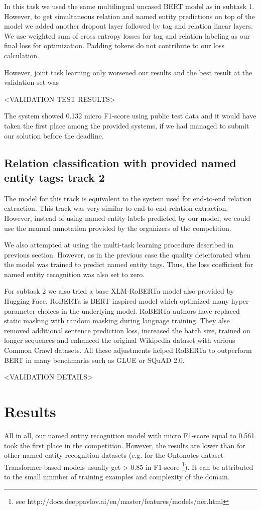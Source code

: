 \documentclass{dialogue}
\begin{document}
	In this task we used the same multilingual uncased BERT model as in subtask 1. However, to get simultaneous relation and named entity predictions on top of the model we added another dropout layer followed by tag and relation linear layers. We use weighted sum of cross entropy losses for tag and relation labeling as our final loss for optimization. Padding tokens do not contribute to our loss calculation.
	
	However, joint task learning only worsened our results and the best result at the validation set was
	
	<VALIDATION TEST RESULTS>
	
	The system showed 0.132 micro F1-score using public test data and it would have taken the first place among the provided systems, if we had managed to submit our solution before the deadline.
	\subsection{Relation classification with provided named entity tags: track 2}
	The model for this track is equivalent to the system used for end-to-end relation extraction. This track was very similar to end-to-end relation extraction. However, instead of using named entity labels predicted by our model, we could use the manual annotation provided by the organizers of the competition.
	
	We also attempted at using the multi-task learning procedure described in previous section. However, as in the previous case the quality deteriorated when the model was trained to predict named entity tags. Thus, the loss coefficient for named entity recognition was also set to zero.
	
	For subtask 2 we also tried a base XLM-RoBERTa \cite{roberta} model also provided by Hugging Face. RoBERTa is BERT inspired model which optimized many hyper-parameter choices in the underlying model. RoBERTa authors have replaced static masking with random masking during language training. They alse removed additional sentence prediction loss, increased the batch size, trained on longer sequences and enhanced the original Wikipedia dataset with various Common Crawl datasets. All these adjustments helped RoBERTa to outperform BERT in many benchmarks such as GLUE or SQuAD 2.0.
	
	<VALIDATION DETAILS>
	
	\section{Results}
	All in all, our named entity recognition model with micro F1-score equal to 0.561 took the first place in the competition. However, the results are lower than for other named entity recognition datasets (e.g. for the Ontonotes dataset Transformer-based models usually get > 0.85 in F1-score \footnote{see http://docs.deeppavlov.ai/en/master/features/models/ner.html}). It can be attributed to the small nmmber of training examples and complexity of the domain.
	
\end{document}
